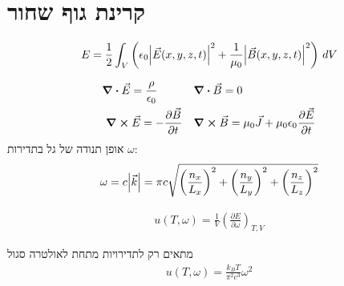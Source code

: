 \section{קרינת גוף שחור}
\begin{cheatformula}
\begin{align*}
    E = \frac{1}{2} \int_V \left( \epsilon_0 \abs{\vec{E}(x, y, z, t)}^2 + \frac{1}{\mu_0} \abs{\vec{B}(x, y, z, t)}^2 \right) \, dV
\end{align*}
\end{cheatformula}
\begin{cheatformula}
    \begin{align*}
    & \div \vec{E} = \frac{\rho}{\epsilon_0} 
    && \div \vec{B} = 0 \\
    &\ \curl \vec{E} = -\frac{\partial \vec{B}}{\partial t}
    && \curl \vec{B} = \mu_0 \vec{J} + \mu_0 \epsilon_0 \frac{\partial \vec{E}}{\partial t}
\end{align*}
אופן תנודה של גל בתדירות $\omega$:
\[
\omega = c \abs{\vec{k}} = \pi c \sqrt{ \left( \frac{n_x}{L_x} \right)^2 + \left( \frac{n_y}{L_y} \right)^2 + \left( \frac{n_z}{L_z} \right)^2 }
\]

\end{cheatformula}

\begin{cheatformula}
\begin{align*}
    u(T,\omega) = \frac{1}{V} \left( \frac{\partial E}{\partial \omega} \right)_{T,V}
\end{align*}    
\end{cheatformula}

\begin{cheatformula}
מתאים רק לתדירויות מתחת לאולטרה סגול
\begin{align*}
    u(T,\omega) = \frac{k_B T}{\pi^2 c^3} \omega^2
\end{align*}

\end{cheatformula}

